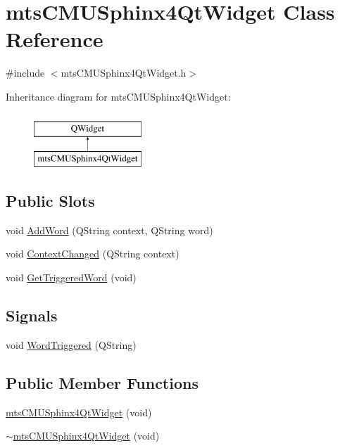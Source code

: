\hypertarget{classmts_c_m_u_sphinx4_qt_widget}{\section{mts\-C\-M\-U\-Sphinx4\-Qt\-Widget Class Reference}
\label{classmts_c_m_u_sphinx4_qt_widget}
}


{\ttfamily \#include $<$mts\-C\-M\-U\-Sphinx4\-Qt\-Widget.\-h$>$}

Inheritance diagram for mts\-C\-M\-U\-Sphinx4\-Qt\-Widget\-:\begin{figure}[H]
\begin{center}
\leavevmode
\includegraphics[height=2.000000cm]{d8/d9d/classmts_c_m_u_sphinx4_qt_widget}
\end{center}
\end{figure}
\subsection*{Public Slots}
\begin{DoxyCompactItemize}
\item 
void \hyperlink{classmts_c_m_u_sphinx4_qt_widget_ae3c3373c0fa186d55a40a9f8c97a29b5}{Add\-Word} (Q\-String context, Q\-String word)
\item 
void \hyperlink{classmts_c_m_u_sphinx4_qt_widget_a33698dc08fa2e3ed63a872fc91a626eb}{Context\-Changed} (Q\-String context)
\item 
void \hyperlink{classmts_c_m_u_sphinx4_qt_widget_adad1191cef15d968e9f3195f8a864f01}{Get\-Triggered\-Word} (void)
\end{DoxyCompactItemize}
\subsection*{Signals}
\begin{DoxyCompactItemize}
\item 
void \hyperlink{classmts_c_m_u_sphinx4_qt_widget_a19864aefc0dab3cfcc1652491ead2ea2}{Word\-Triggered} (Q\-String)
\end{DoxyCompactItemize}
\subsection*{Public Member Functions}
\begin{DoxyCompactItemize}
\item 
\hyperlink{classmts_c_m_u_sphinx4_qt_widget_a2c1f05163a739c9d1e2a952878bb83bd}{mts\-C\-M\-U\-Sphinx4\-Qt\-Widget} (void)
\item 
\hyperlink{classmts_c_m_u_sphinx4_qt_widget_aec927ff8f062a0e8daf26a931e9e4899}{$\sim$mts\-C\-M\-U\-Sphinx4\-Qt\-Widget} (void)
\end{DoxyCompactItemize}
